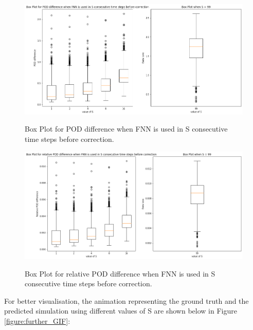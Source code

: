 \begin{figure}[H]
    \caption{Box Plot for POD difference when FNN is used in S consecutive time steps before correction.}
    \includegraphics[scale=0.4]{figures/mantle_convection_images/further_testings/POD_boxplot.png}
    \label{figure:further_POD_Box}
\end{figure}

\begin{figure}[H]
    \caption{Box Plot for relative POD difference when FNN is used in S consecutive time steps before correction.}
    \includegraphics[scale=0.4]{figures/mantle_convection_images/further_testings/Relative_POD_boxplot.png}
    \label{figure:further_relative_POD_Box}
\end{figure}

For better visualisation, the animation representing the ground truth and the predicted simulation using different values of S are shown below in Figure \ref{figure:further_GIF}:

